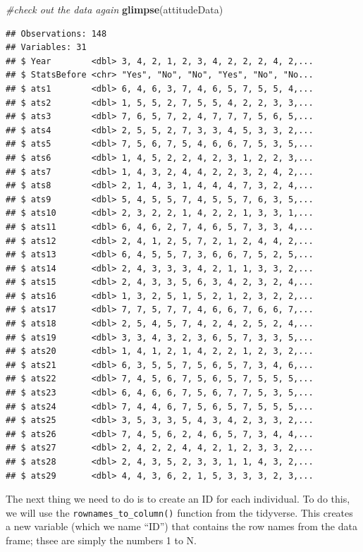 \documentclass[12pt,]{book}
\newenvironment{Shaded}{\begin{snugshade}}{\end{snugshade}}
\newcommand{\CommentTok}[1]{\textcolor[rgb]{0.56,0.35,0.01}{\textit{#1}}}
\newcommand{\KeywordTok}[1]{\textcolor[rgb]{0.13,0.29,0.53}{\textbf{#1}}}
\newcommand{\NormalTok}[1]{#1}
\begin{document}
\begin{Shaded}
\begin{Highlighting}[]
\CommentTok{#check out the data again}
\KeywordTok{glimpse}\NormalTok{(attitudeData)}
\end{Highlighting}
\end{Shaded}

\begin{verbatim}
## Observations: 148
## Variables: 31
## $ Year        <dbl> 3, 4, 2, 1, 2, 3, 4, 2, 2, 2, 4, 2,...
## $ StatsBefore <chr> "Yes", "No", "No", "Yes", "No", "No...
## $ ats1        <dbl> 6, 4, 6, 3, 7, 4, 6, 5, 7, 5, 5, 4,...
## $ ats2        <dbl> 1, 5, 5, 2, 7, 5, 5, 4, 2, 2, 3, 3,...
## $ ats3        <dbl> 7, 6, 5, 7, 2, 4, 7, 7, 7, 5, 6, 5,...
## $ ats4        <dbl> 2, 5, 5, 2, 7, 3, 3, 4, 5, 3, 3, 2,...
## $ ats5        <dbl> 7, 5, 6, 7, 5, 4, 6, 6, 7, 5, 3, 5,...
## $ ats6        <dbl> 1, 4, 5, 2, 2, 4, 2, 3, 1, 2, 2, 3,...
## $ ats7        <dbl> 1, 4, 3, 2, 4, 4, 2, 2, 3, 2, 4, 2,...
## $ ats8        <dbl> 2, 1, 4, 3, 1, 4, 4, 4, 7, 3, 2, 4,...
## $ ats9        <dbl> 5, 4, 5, 5, 7, 4, 5, 5, 7, 6, 3, 5,...
## $ ats10       <dbl> 2, 3, 2, 2, 1, 4, 2, 2, 1, 3, 3, 1,...
## $ ats11       <dbl> 6, 4, 6, 2, 7, 4, 6, 5, 7, 3, 3, 4,...
## $ ats12       <dbl> 2, 4, 1, 2, 5, 7, 2, 1, 2, 4, 4, 2,...
## $ ats13       <dbl> 6, 4, 5, 5, 7, 3, 6, 6, 7, 5, 2, 5,...
## $ ats14       <dbl> 2, 4, 3, 3, 3, 4, 2, 1, 1, 3, 3, 2,...
## $ ats15       <dbl> 2, 4, 3, 3, 5, 6, 3, 4, 2, 3, 2, 4,...
## $ ats16       <dbl> 1, 3, 2, 5, 1, 5, 2, 1, 2, 3, 2, 2,...
## $ ats17       <dbl> 7, 7, 5, 7, 7, 4, 6, 6, 7, 6, 6, 7,...
## $ ats18       <dbl> 2, 5, 4, 5, 7, 4, 2, 4, 2, 5, 2, 4,...
## $ ats19       <dbl> 3, 3, 4, 3, 2, 3, 6, 5, 7, 3, 3, 5,...
## $ ats20       <dbl> 1, 4, 1, 2, 1, 4, 2, 2, 1, 2, 3, 2,...
## $ ats21       <dbl> 6, 3, 5, 5, 7, 5, 6, 5, 7, 3, 4, 6,...
## $ ats22       <dbl> 7, 4, 5, 6, 7, 5, 6, 5, 7, 5, 5, 5,...
## $ ats23       <dbl> 6, 4, 6, 6, 7, 5, 6, 7, 7, 5, 3, 5,...
## $ ats24       <dbl> 7, 4, 4, 6, 7, 5, 6, 5, 7, 5, 5, 5,...
## $ ats25       <dbl> 3, 5, 3, 3, 5, 4, 3, 4, 2, 3, 3, 2,...
## $ ats26       <dbl> 7, 4, 5, 6, 2, 4, 6, 5, 7, 3, 4, 4,...
## $ ats27       <dbl> 2, 4, 2, 2, 4, 4, 2, 1, 2, 3, 3, 2,...
## $ ats28       <dbl> 2, 4, 3, 5, 2, 3, 3, 1, 1, 4, 3, 2,...
## $ ats29       <dbl> 4, 4, 3, 6, 2, 1, 5, 3, 3, 3, 2, 3,...
\end{verbatim}

The next thing we need to do is to create an ID for each individual. To do this, we will use the \texttt{rownames\_to\_column()} function from the tidyverse. This creates a new variable (which we name ``ID'') that contains the row names from the data frame; thsee are simply the numbers 1 to N.
\end{document}
